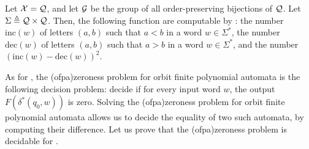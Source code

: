 \begin{example}
  \label{ex:orbit-finite-polynomial-automata}
  Let $\mathcal{X} = \mathcal{Q}$, and let $\mathcal{G}$ be the group of all
  order-preserving bijections of $\mathcal{Q}$.
  Let $\Sigma \triangleq \mathcal{Q} \times \mathcal{Q}$.
  Then, the following function are computable by 
  :
  the number $\mathrm{inc}(w)$ of letters $(a,b)$ such that $a < b$ in a word $w \in \Sigma^*$,
  the number $\mathrm{dec}(w)$ of letters $(a,b)$ such that $a > b$ in a word $w \in \Sigma^*$,
  and the number $(\mathrm{inc}(w) - \mathrm{dec}(w))^2$.
\end{example}

\AP As for , the \intro(ofpa){zeroness problem} for
orbit finite polynomial automata is the following decision problem: decide if
for every input word $w$, the output $F(\delta^*(q_0, w))$ is zero. Solving the
\kl(ofpa){zeroness problem} for orbit finite polynomial automata allows us to
decide the equality of two such automata, by computing their difference. Let us
prove that the \kl(ofpa){zeroness problem} is decidable for .


